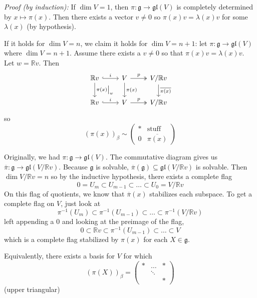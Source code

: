 \documentclass[12pt]{article}
\newcommand{\R}{\mathbb{R}}
\newcommand{\g}{\mathfrak{g}}
\newcommand{\gl}{\mathfrak{gl}}
\renewcommand{\bar}{\overline}
\newenvironment*{tbox}[2][gray]{
    \begin{tcolorbox}[
        parbox=false,
        colback=#1!5!white,
        colframe=#1!75!black,
        breakable,
        title={#2}
    ]}
    {\end{tcolorbox}}
\begin{document}
    \begin{tbox}{\textbf{Corollary of Lie's Theorem:} If you have the same context as the theorem, then there exists a sequence of subspaces 
        \[0 = V \subset V_m \subset V_{m-1} \subset \dots \subset V_0 = V\]
        such that each $V_i$ is stable under $\pi(X) \in \gl(V)$ and each is codimension 1 in the next. }

        \emph{Proof (by induction):} If $\dim V = 1$, then $\pi: \g \to \gl(V)$ is completely determined by $x \mapsto \pi(x)$. Then there exists a vector $v \neq 0$ so $\pi(x)v = \lambda(x) v$ for some $\lambda(x)$ (by hypothesis). 
        
        If it holds for $\dim V = n$, we claim it holds for $\dim V = n + 1$: let $\pi: \g \to \gl(V)$ where $\dim V = n+1$. Assume there exists a $v \neq 0$ so that $\pi(x)v = \lambda(x) v$. Let $w = \R v$. Then 
        \[\begin{tikzcd}
            \R v \arrow[hook]{r}{i} \arrow{d}{\pi(x)\big\vert_w} & V \arrow{d}{\pi(x)} \arrow[two heads]{r}{p} & V/\R v \arrow{d}{\overline{\pi(x)}}\\ 
            \R v \arrow[hook]{r}{i} & V \arrow[two heads]{r}{p} & V/\R v 
        \end{tikzcd}\]
        so 
        \[(\pi(x))_{\beta} \sim \left(\begin{array}{c|c}
            * & \text{stuff}\\ 
            \hline 
            0 & \overline{\pi(x)}
        \end{array}\right)\]

        Originally, we had $\pi: \g \to \gl(V)$. The commutative diagram gives us $\bar \pi: \g \to \gl(V/\R v)$. Because $\g$ is solvable, $\bar \pi(\g) \subseteq \gl(V/\R v)$ is solvable. Then $\dim V/\R v = n$ so by the inductive hypothesis, there exists a complete flag 
        \[0 = U_m \subset U_{m-1} \subset \dots \subset U_0 = V/\R v\]
        On this flag of quotients, we know that $\bar \pi(x)$ stabilizes each subspace. To get a complete flag on $V$, just look at 
        \[\pi^{-1}(U_m) \subset \pi^{-1}(U_{m-1}) \subset \dots \subset \pi^{-1}(V/\R v)\] 
        left appending a $0$ and looking at the preimage of the flag, 
        \[0 \subset \R v \subset \pi^{-1}(U_{m-1}) \subset \dots \subset V\]
        which is a complete flag stabilized by $\pi(x)$ for each $X \in \g$. 
    \end{tbox}

    Equivalently, there exists a basis for $V$ for which 
    \[(\pi(X))_{\beta} = \begin{pmatrix}
        * & \dots & *\\ 
        & \ddots\\
        & & *
    \end{pmatrix}\]
    (upper triangular)
\end{document}
